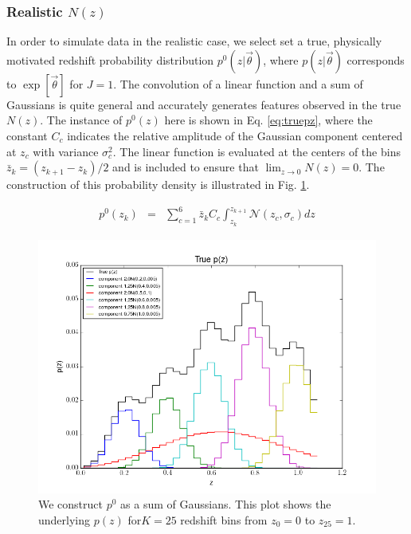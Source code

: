 \documentclass[preprint]{aastex}
\begin{document}

\subsubsection{Realistic $N(z)$}
\label{sec:realnz}

In order to simulate data in the realistic case, we select set a true, physically motivated redshift probability distribution $p^{0}(z|\vec{\theta})$, where $p(z|\vec{\theta})$ corresponds to $\exp[\vec{\theta}]$ for $J=1$.  The convolution of a linear function and a sum of Gaussians is quite general and accurately generates features observed in the true $N(z)$.  The instance of $p^{0}(z)$ here is shown in Eq. \ref{eq:truepz}, where the constant $C_{c}$ indicates the relative amplitude of the Gaussian component centered at $z_{c}$ with variance $\sigma_{c}^{2}$.  The linear function is evaluated at the centers of the bins $\bar{z}_{k}=(z_{k+1}-z_{k})/2$ and is included to ensure that $\lim_{z\to0}N(z)=0$.  The construction of this probability density is illustrated in Fig. \ref{fig:truepz}.  %

\begin{eqnarray}
\label{eq:truepz}
p^{0}(z_{k}) &=& \sum_{c=1}^{6}\bar{z}_{k}C_{c}\int_{z_{k}}^{z_{k+1}} \mathcal{N}(z_{c},\sigma_{c})dz
\end{eqnarray}

\begin{figure}
\includegraphics[width=\textwidth]{truePz.png}
\caption{We construct $p^{0}$ as a sum of Gaussians.  This plot shows the underlying $p(z)$ for$K=25$ redshift bins from $z_{0}=0$ to $z_{25}=1$.}
\label{fig:truepz}
\end{figure}
\end{document}
